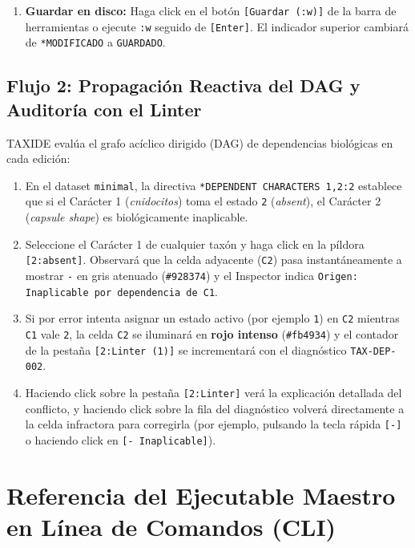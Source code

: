 \documentclass[11pt,a4paper]{article}
\newcommand{\keystroke}[1]{\texttt{[#1]}}
\begin{document}
\begin{enumerate}
    \item \textbf{Guardar en disco:}
    Haga click en el botón \texttt{[Guardar (:w)]} de la barra de herramientas o ejecute \texttt{:w} seguido de \keystroke{Enter}. El indicador superior cambiará de \texttt{*MODIFICADO} a \texttt{GUARDADO}.
\end{enumerate}

\subsection{Flujo 2: Propagación Reactiva del DAG y Auditoría con el Linter}
TAXIDE evalúa el grafo acíclico dirigido (DAG) de dependencias biológicas en cada edición:
\begin{enumerate}
    \item En el dataset \texttt{minimal}, la directiva \texttt{*DEPENDENT CHARACTERS 1,2:2} establece que si el Carácter 1 (\textit{cnidocitos}) toma el estado \texttt{2} (\textit{absent}), el Carácter 2 (\textit{capsule shape}) es biológicamente inaplicable.
    \item Seleccione el Carácter 1 de cualquier taxón y haga click en la píldora \texttt{[2:absent]}. Observará que la celda adyacente (\texttt{C2}) pasa instantáneamente a mostrar \texttt{-} en gris atenuado (\texttt{\#928374}) y el Inspector indica \texttt{Origen: Inaplicable por dependencia de C1}.
    \item Si por error intenta asignar un estado activo (por ejemplo \texttt{1}) en \texttt{C2} mientras \texttt{C1} vale \texttt{2}, la celda \texttt{C2} se iluminará en \textbf{rojo intenso} (\texttt{\#fb4934}) y el contador de la pestaña \texttt{[2:Linter (1)]} se incrementará con el diagnóstico \texttt{TAX-DEP-002}.
    \item Haciendo click sobre la pestaña \texttt{[2:Linter]} verá la explicación detallada del conflicto, y haciendo click sobre la fila del diagnóstico volverá directamente a la celda infractora para corregirla (por ejemplo, pulsando la tecla rápida \keystroke{-} o haciendo click en \texttt{[- Inaplicable]}).
\end{enumerate}

\section{Referencia del Ejecutable Maestro en Línea de Comandos (CLI)}
\label{sec:cli}
\end{document}
